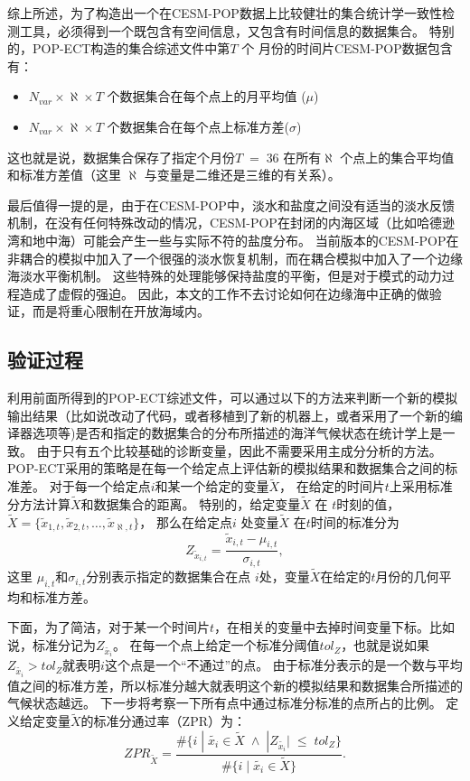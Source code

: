 
综上所述，为了构造出一个在CESM-POP数据上比较健壮的集合统计学一致性检测工具，必须得到一个既包含有空间信息，又包含有时间信息的数据集合。
特别的，POP-ECT构造的集合综述文件中第$T$ 个 月份的时间片CESM-POP数据包含有：
\begin{itemize}
 \item $N_{var} \times \aleph \times T$ 个数据集合在每个点上的月平均值 ($\mu$)
 \item $N_{var} \times \aleph \times T$ 个数据集合在每个点上标准方差($\sigma$)
 \end{itemize}
 这也就是说，数据集合保存了指定个月份$T \;=\; 36$ 在所有$\aleph$ 个点上的集合平均值和标准方差值（这里 $\aleph$ 与变量是二维还是三维的有关系）。
 

最后值得一提的是，由于在CESM-POP中，淡水和盐度之间没有适当的淡水反馈机制，在没有任何特殊改动的情况，CESM-POP在封闭的内海区域（比如哈德逊湾和地中海）可能会产生一些与实际不符的盐度分布。
当前版本的CESM-POP在非耦合的模拟中加入了一个很强的淡水恢复机制，而在耦合模拟中加入了一个边缘海淡水平衡机制。
这些特殊的处理能够保持盐度的平衡，但是对于模式的动力过程造成了虚假的强迫。
因此，本文的工作不去讨论如何在边缘海中正确的做验证，而是将重心限制在开放海域内。

\subsection{验证过程}
\label{verify:ECTprocess}
 
利用前面所得到的POP-ECT综述文件，可以通过以下的方法来判断一个新的模拟输出结果（比如说改动了代码，或者移植到了新的机器上，或者采用了一个新的编译器选项等)是否和指定的数据集合的分布所描述的海洋气候状态在统计学上是一致。 
由于只有五个比较基础的诊断变量，因此不需要采用主成分分析的方法。 
POP-ECT采用的策略是在每一个给定点上评估新的模拟结果和数据集合之间的标准差。
对于每一个给定点$i$和某一个给定的变量$\tilde{{X}}$， 在给定的时间片$t$上采用标准分方法计算$\tilde{{X}}$和数据集合的距离。 
特别的，给定变量$\tilde{{X}}$ 在 $t$时刻的值，$\tilde{{X}} = \{ \tilde{x}_{1,t}, \tilde{x}_{2,t}, \dots, \tilde{x}_{\aleph,t}\}$， 那么在给定点$i$ 处变量$\tilde{{X}}$ 在$t$时间的标准分为
\begin{equation*}
Z_{\tilde{x}_{i,t}}=  \frac{\tilde{x}_{i,t} -\mu_{i,t}}{\sigma_{i,t}},
\end{equation*}
这里 $\mu_{i,t}$和$\sigma_{i,t}$分别表示指定的数据集合在点 $i$处，变量$\tilde{{X}}$在给定的$t$月份的几何平均和标准方差。  

 
下面，为了简洁，对于某一个时间片$t$，在相关的变量中去掉时间变量下标。比如说，标准分记为$Z_{\tilde{x_i}}$。 
在每一个点上给定一个标准分阈值$tol_{Z}$，也就是说如果 $Z_{\tilde{x_i}} > tol_{Z}$就表明$i$这个点是一个“不通过”的点。 
由于标准分表示的是一个数与平均值之间的标准方差，所以标准分越大就表明这个新的模拟结果和数据集合所描述的气候状态越远。 
下一步将考察一下所有点中通过标准分标准的点所占的比例。 定义给定变量$\tilde{X}$的标准分通过率（ZPR）为：
\begin{equation}\label{e:zpr}
ZPR_{\tilde{X}} = \frac{ \#\{i \;|\; \tilde{x_i} \in \tilde{X} \; \land \; |Z_{\tilde{x_i}}| \; \leq \; tol_{Z}\} }{\#\{i \;|\; \tilde{x_i} \in \tilde{X} \} }.
\end{equation}
 
